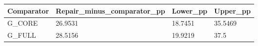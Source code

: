 \begin{tabular}{llll}
Comparator & Repair\_minus\_comparator\_pp & Lower\_pp & Upper\_pp \\
\hline
G\_CORE & 26.9531 & 18.7451 & 35.5469 \\
G\_FULL & 28.5156 & 19.9219 & 37.5 \\
\end{tabular}
